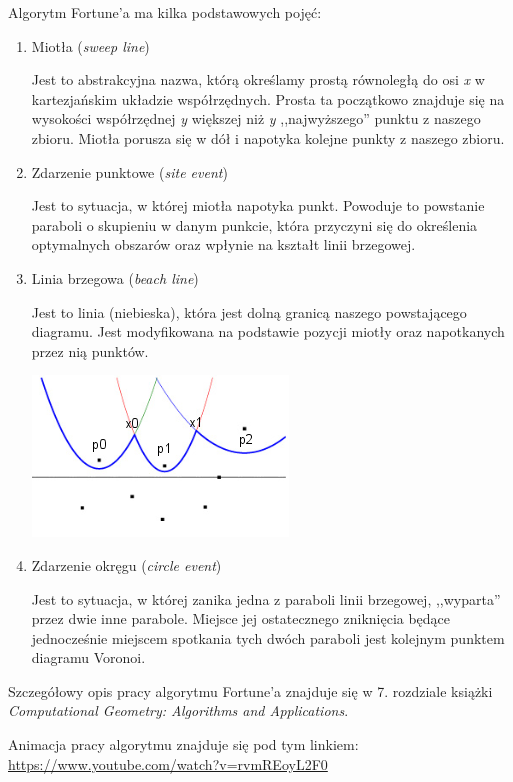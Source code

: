 \documentclass[a4paper,11pt]{article}
\begin{document}
\noindent
Algorytm Fortune'a ma kilka podstawowych pojęć:
\begin{enumerate}
\item Miotła (\textit{sweep line})

Jest to abstrakcyjna nazwa, którą określamy prostą równoległą do osi \textit{x} w kartezjańskim układzie współrzędnych. Prosta ta początkowo znajduje się na wysokości współrzędnej \textit{y} większej niż \textit{y} ,,najwyższego'' punktu z naszego zbioru. Miotła porusza się w dół i napotyka kolejne punkty z naszego zbioru.
\item Zdarzenie punktowe (\textit{site event})

Jest to sytuacja, w której miotła napotyka punkt. Powoduje to powstanie paraboli o skupieniu w danym punkcie, która przyczyni się do określenia optymalnych obszarów oraz wpłynie na kształt linii brzegowej.
\item Linia brzegowa (\textit{beach line})

Jest to linia (niebieska), która jest dolną granicą naszego powstającego diagramu. Jest modyfikowana na podstawie pozycji miotły oraz napotkanych przez nią punktów.

\includegraphics[scale=1]{beachline}

\item Zdarzenie okręgu (\textit{circle event})

Jest to sytuacja, w której zanika jedna z paraboli linii brzegowej, ,,wyparta'' przez dwie inne parabole. Miejsce jej ostatecznego zniknięcia będące jednocześnie miejscem spotkania tych dwóch paraboli jest kolejnym punktem diagramu Voronoi.
\end{enumerate}

Szczegółowy opis pracy algorytmu Fortune'a znajduje się w 7. rozdziale książki \textit{Computational Geometry: Algorithms and Applications}.

Animacja pracy algorytmu znajduje się pod tym linkiem: \url{https://www.youtube.com/watch?v=rvmREoyL2F0}{}
\end{document}
